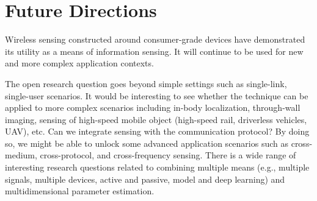 \section{Future Directions}

Wireless sensing constructed around consumer-grade devices have demonstrated its utility as a means of information sensing. It will
continue to be used for new and more complex application contexts.

The open research question goes beyond simple settings such as single-link, single-user scenarios. It would be interesting to see whether
the technique can be applied to more complex scenarios including in-body localization, through-wall imaging, sensing of high-speed mobile
object (high-speed rail, driverless vehicles, UAV), etc. Can we integrate sensing with the communication protocol? By doing so, we might be
able to unlock some advanced application scenarios such as cross-medium, cross-protocol, and cross-frequency sensing. There is a wide range
of interesting research questions related to combining multiple means (e.g., multiple signals, multiple devices, active and passive, model
and deep learning) and multidimensional parameter estimation.
